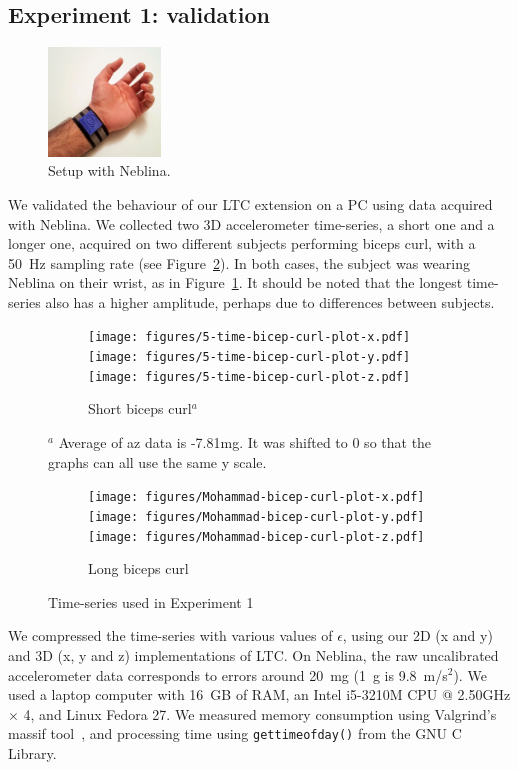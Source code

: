 \documentclass{report}
\begin{document}
\subsection{Experiment 1: validation}

\begin{figure}
\includegraphics[width=3cm]{figures/neblina-wrist.png}
\caption{Setup with Neblina.}
\label{fig:neblina-wrist}
\end{figure}
We validated the behaviour of our LTC extension on a PC using data 
acquired with Neblina. We collected two 3D accelerometer time-series, a 
short one and a longer one, acquired on two different subjects 
performing biceps curl, with a 50~Hz sampling rate (see 
Figure~\ref{fig:datasets-1}). In both cases, the subject was wearing 
Neblina on their wrist, as in Figure~\ref{fig:neblina-wrist}. It should be noted that the longest
time-series also has a higher amplitude, perhaps due to differences between 
subjects.

\begin{figure}
\centering
\begin{subfigure}{1.85\columnwidth}
\centering
\texttt{[image: figures/5-time-bicep-curl-plot-x.pdf]}
\texttt{[image: figures/5-time-bicep-curl-plot-y.pdf]}
\texttt{[image: figures/5-time-bicep-curl-plot-z.pdf]}
\caption{Short biceps curl$^a$}
\end{subfigure}

{\footnotesize $^a$ Average 
of az data is -7.81mg. It was shifted to 0 so that the graphs can all 
use the same y scale.}

\begin{subfigure}{1.85\columnwidth}
\centering
\texttt{[image: figures/Mohammad-bicep-curl-plot-x.pdf]}
\texttt{[image: figures/Mohammad-bicep-curl-plot-y.pdf]}
\texttt{[image: figures/Mohammad-bicep-curl-plot-z.pdf]}
\caption{Long biceps curl}
\end{subfigure}

\caption{Time-series used in Experiment 1}
\label{fig:datasets-1}
\end{figure}

We compressed the time-series with various values of $\epsilon$, using 
our 2D (x and y) and 3D (x, y and z) implementations of LTC. On 
Neblina, the raw uncalibrated accelerometer data corresponds to errors 
around 20~mg (1~g is 9.8~m/s$^2$). We used a 
laptop computer with 16~GB of RAM, an Intel i5-3210M CPU @ 2.50GHz 
$\times$ 4, and Linux Fedora 27. We measured memory consumption using 
Valgrind's massif 
tool~\cite{nethercote2006building}, 
and processing time using \texttt{gettimeofday()} from the GNU C 
Library. 
\end{document}
